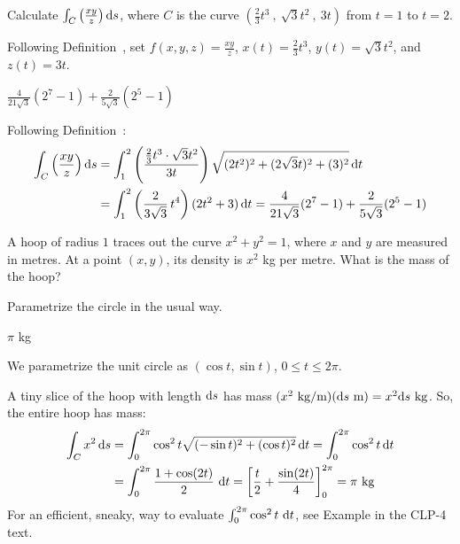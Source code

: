 \begin{question}
Calculate $\int_C \left(\frac{xy}{z}\right)\mathrm{d}s$, where $C$ is the curve $\left( \frac23t^3~,~\sqrt{3}t^2~,~3t \right)$ from $t=1$ to $t=2$.
\end{question}
\begin{hint}
Following Definition~, set $f(x,y,z)=\frac{xy}{z}$, $x(t)=\frac23 t^3$, $y(t)=\sqrt3t^2$, and $z(t)=3t$.
\end{hint}
\begin{answer}
$ \frac{4}{21\sqrt 3}(2^7-1) + \frac{2}{5\sqrt 3}(2^5-1)$
\end{answer}
\begin{solution}
Following Definition~:
\begin{align*}
\int_C \left(\frac{xy}{z}\right)\mathrm{d}s&=\int_1^2 \left(\frac{\frac23t^3 \cdot \sqrt{3}t^2}{ 3t} \right)\sqrt{(2t^2)^2+(2\sqrt3 t)^2+(3)^2}\,\mathrm{d}t\\
&=\int_1^2 \left(\frac{2}{ 3\sqrt 3} \,t^4\right)(2t^2+3)\,\mathrm{d}t = \frac{4}{21\sqrt 3}(2^7-1) + \frac{2}{5\sqrt 3}(2^5-1)
\end{align*}
\end{solution}
\begin{question}
	A hoop of radius $1$ traces out the curve $x^2+y^2=1$, where $x$ and $y$ are measured in metres. At a point $(x,y)$, its density is $x^2$ kg per metre. What is the mass of the hoop?
\end{question}
\begin{hint}
	Parametrize the circle in the usual way.
\end{hint}
\begin{answer}
	$\pi$ kg
\end{answer}
\begin{solution}
	We parametrize the unit circle as $(\cos t, \sin t)$, $0 \le t \le 2\pi$.
	
		A tiny slice of the hoop with length $\mathrm{d}s$ has mass $(x^2~ \mathrm{kg}/\mathrm{m})(\mathrm{d}s~ \mathrm{m})=x^2\mathrm{d}s~ \mathrm{kg}$. So, the entire hoop has mass:
		\begin{align*}
			\int_C x^2\,\mathrm{d}s&=\int_0^{2\pi} \cos^2 t \sqrt{(-\sin t)^2+(\cos t)^2}\,\mathrm{d}t=\int_0^{2\pi} \cos^2 t \,\mathrm{d}t\\
&=\int_0^{2\pi} \frac{1+\cos(2t)}{2}\ \mathrm{d}t
                 =\left[\frac{t}{2} +\frac{\sin(2t)}{4} \right]_0^{2\pi}=\pi ~\mathrm{kg}
			\end{align*}
			 For an efficient, sneaky, way to evaluate 
                 $\int_0^{2\pi} \cos^2 t\ \mathrm{d}t$, see Example
                  in the CLP-4 text.
\end{solution}

